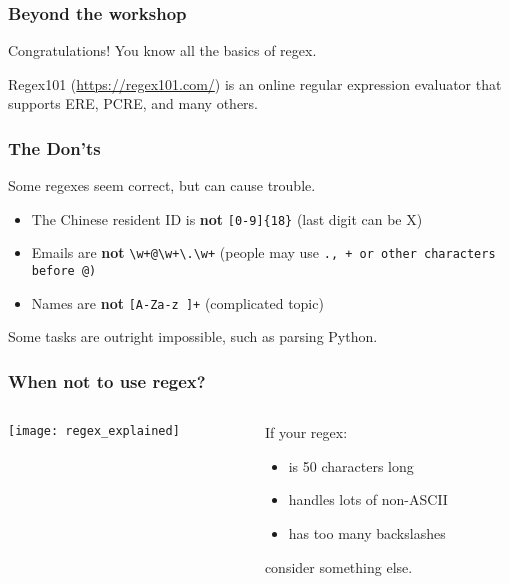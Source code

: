 \begin{frame}
\frametitle{Beyond the workshop}
Congratulations! You know all the basics of regex.
\bigskip

Regex101 (\url{https://regex101.com/}) is an online regular expression
evaluator that supports ERE, PCRE, and many others.
\end{frame}

\begin{frame}[fragile]
\frametitle{The Don'ts}
Some regexes seem correct, but can cause trouble.
\begin{itemize}
    \item The Chinese resident ID is \textbf{not} \verb|[0-9]{18}| (last digit
        can be X)
    \item Emails are \textbf{not} \verb|\w+@\w+\.\w+| (people may use \tt{.},
        \tt{+} or other characters before \tt{@})
    \item Names are \textbf{not} \verb|[A-Za-z ]+| (complicated topic)
\end{itemize}
\bigskip

Some tasks are outright impossible, such as parsing Python.
\end{frame}

\begin{frame}
\frametitle{When not to use regex?}
\begin{columns}
    \begin{column}{0.6\textwidth}
        \texttt{[image: regex\_explained]}
    \end{column}
    \begin{column}{0.4\textwidth}
        If your regex:
        \begin{itemize}
            \item is 50 characters long
            \item handles lots of non-ASCII
            \item has too many backslashes
        \end{itemize}
        consider something else.
    \end{column}
\end{columns}
\end{frame}

